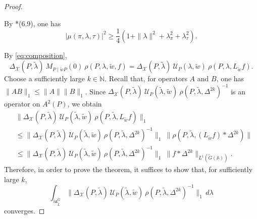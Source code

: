 \documentclass[12pt]{amsart}
\theoremstyle{definition}
\theoremstyle{plain}
\theoremstyle{remark}
\def\N{\mathbb{N}}
\def\A{\mathbb{A}}%
\newcommand{\fa}{\mathfrak{a}}
\newcommand{\cU}{\mathcal{U}}
\newcommand{\cX}{\mathcal{X}}
\numberwithin{equation}{section}
\newcommand{\tG}{\widetilde{G}}
\newcommand{\tL}{\widetilde{L}}
\newcommand{\tlambda}{\widetilde{\lambda}}
\newcommand{\tw}{\widetilde{w}}
\begin{document}
\begin{proof}
\begin{itemize}
    By \cite{Mul02}*{(6.9)}, one has
    \begin{equation}\label{eq:101}
        |\mu(\pi,\lambda,\tau)|^2\ge \frac{1}{4}(1+\|\lambda\|^2+\lambda_\pi^2+\lambda_\tau^2).
    \end{equation}
\end{itemize}
   By \eqref{eq:composition},
    \[
    \Delta_{\cX}(P,\tlambda) \ M_{P\mid \tw P}(0) \ \rho(P,\lambda,\tw,f) = \Delta_{\cX}(P,\tlambda) \ \cU_P(\lambda,\tw) \ \rho(P,\lambda,L_{\tw} f) .
    \]
    Choose a sufficiently large $k\in\N$.
    Recall that, for operators $A$ and $B$, one has $\|AB\|_1\le \|A\|\|B\|_1$.
    Since $\Delta_{\cX}(P,\tlambda) \ \cU_P(\tlambda,\tw) \ \rho(P,\tlambda,\Delta^{2k})^{-1}$ is an operator on $A^2(P)$, we obtain
    \begin{align*}
        & \|\Delta_{\cX}(P,\tlambda) \ \cU_P(\tlambda,\tw) \ \rho(P,\tlambda,L_{\tw} f)\|_1 \\
        &\le \|\Delta_{\cX}(P,\tlambda) \ \cU_P(\tlambda,\tw) \ \rho(P,\tlambda,\Delta^{2k})^{-1}\|_1 \ \| \rho(P,\tlambda,(L_{\tw} f)*\Delta^{2k})\| \\
        &\le  \|\Delta_{\cX}(P,\tlambda) \ \cU_P(\tlambda,\tw) \ \rho(P,\tlambda,\Delta^{2k})^{-1}\|_1 \ \|  f*\Delta^{2k}\|_{L^1(\tG(\A))}.
    \end{align*}
    Therefore, in order to prove the theorem, it suffices to show that, for sufficiently large $k$,
    \begin{equation}\label{eq:102}
        \int_{i\fa_{\tL}^{\tG}} \|\Delta_{\cX}(P,\tlambda) \ \cU_P(\tlambda,\tw) \ \rho(P,\tlambda,\Delta^{2k})^{-1}\|_1 \, d\lambda        
    \end{equation}
    converges.


\end{proof}
\end{document}

